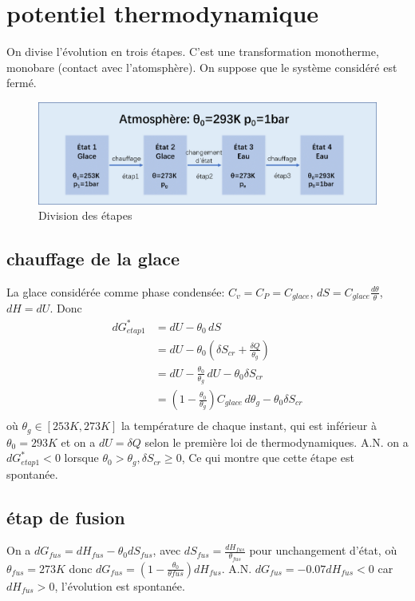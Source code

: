 \documentclass[a4paper,12pt]{book}
\begin{document}
\section{potentiel thermodynamique}
On divise l'évolution en trois étapes. C'est une transformation monotherme, monobare (contact avec l'atomsphère). 
On suppose que le système considéré est fermé. 
\begin{figure}[h]
    \begin{center}
    \includegraphics[scale=0.5]{dm1.png}
    \end{center}
    \caption{Division des étapes}
\end{figure}
\subsection{chauffage de la glace}
La glace considérée comme phase condensée: $C_v=C_P=C_{glace}$, 
$dS=C_{glace}\frac{d\theta}{\theta}$, $dH=dU$. Donc
\begin{align*}
    dG_{etap1}^*&=dU-\theta_0\,dS\\
                       &=dU-\theta_0(\delta S_{cr}+\frac{\delta Q}{\theta_g})\\
                       &=dU-\frac{\theta_0}{\theta_g}\,dU-\theta_0\delta S_{cr}\\
                       &=\left(1-\frac{\theta_0}{\theta_g}\right)C_{glace}\,d\theta_g-\theta_0\delta S_{cr}\\
\end{align*}
où $\theta_g\in[253K,273K]$ la température de chaque instant, qui est inférieur à $\theta_0=293K$
et on a $dU=\delta Q$ selon le première loi de thermodynamiques.
A.N. on a $\boxed{dG^*_{etap1}<0}$ lorsque $\theta_0>\theta_g, \delta S_{cr}\geq 0$, 
Ce qui montre que cette étape est spontanée.

\subsection{étap de fusion}
On a $dG_{fus}=dH_{fus}-\theta_0dS_{fus}$, avec $dS_{fus}=\frac{dH_{fus}}{\theta_{fus}}$ pour unchangement d'état, où $\theta_{fus}=273K$ 
donc $dG_{fus}= (1-\frac{\theta_0}{\theta{fus}})dH_{fus}$. A.N. $\boxed{dG_{fus}=-0.07dH_{fus}<0}$ car $dH_{fus}>0$, l'évolution est spontanée.
\end{document}
